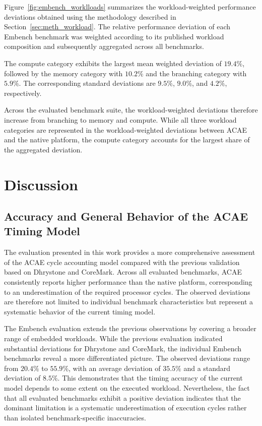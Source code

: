 \documentclass[conference]{IEEEtran}
\begin{document}
			Figure~\ref{fig:embench_worklloads} summarizes the workload-weighted performance deviations obtained using the methodology described in Section~\ref{sec:meth_workload}.
			The relative performance deviation of each Embench benchmark was weighted according to its published workload composition and subsequently aggregated across all benchmarks.

			The compute category exhibits the largest mean weighted deviation of $19.4\%$, followed by the memory category with $10.2\%$ and the branching category with $5.9\%$.
			The corresponding standard deviations are $9.5\%$, $9.0\%$, and $4.2\%$, respectively.

			Across the evaluated benchmark suite, the workload-weighted deviations therefore increase from branching to memory and compute.
			While all three workload categories are represented in the workload-weighted deviations between \ac{ACAE} and the native platform, the compute category accounts for the largest share of the aggregated deviation.

	\section{Discussion}
		\label{sec:discussion}

		\subsection{Accuracy and General Behavior of the ACAE Timing Model}

			The evaluation presented in this work provides a more comprehensive assessment of the \ac{ACAE} cycle accounting model compared with the previous validation based on Dhrystone and CoreMark.
			Across all evaluated benchmarks, \ac{ACAE} consistently reports higher performance than the native platform, corresponding to an underestimation of the required processor cycles.
			The observed deviations are therefore not limited to individual benchmark characteristics but represent a systematic behavior of the current timing model.

			The Embench evaluation extends the previous observations by covering a broader range of embedded workloads.
			While the previous evaluation indicated substantial deviations for Dhrystone and CoreMark, the individual Embench benchmarks reveal a more differentiated picture.
			The observed deviations range from $20.4\%$ to $55.9\%$, with an average deviation of $35.5\%$ and a standard deviation of $8.5\%$.
			This demonstrates that the timing accuracy of the current model depends to some extent on the executed workload.
			Nevertheless, the fact that all evaluated benchmarks exhibit a positive deviation indicates that the dominant limitation is a systematic underestimation of execution cycles rather than isolated benchmark-specific inaccuracies.
\end{document}
